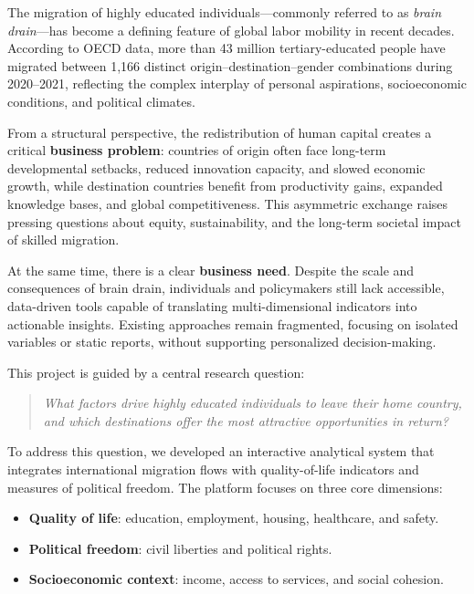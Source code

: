 \documentclass[11pt]{article}
\begin{document}
The migration of highly educated individuals—commonly referred to as \textit{brain drain}—has become a defining feature of global labor mobility in recent decades. According to OECD data, more than 43 million tertiary-educated people have migrated between 1{,}166 distinct origin–destination–gender combinations during 2020–2021, reflecting the complex interplay of personal aspirations, socioeconomic conditions, and political climates.  

\noindent
From a structural perspective, the redistribution of human capital creates a critical \textbf{business problem}: countries of origin often face long-term developmental setbacks, reduced innovation capacity, and slowed economic growth, while destination countries benefit from productivity gains, expanded knowledge bases, and global competitiveness. This asymmetric exchange raises pressing questions about equity, sustainability, and the long-term societal impact of skilled migration.  

\noindent
At the same time, there is a clear \textbf{business need}. Despite the scale and consequences of brain drain, individuals and policymakers still lack accessible, data-driven tools capable of translating multi-dimensional indicators into actionable insights. Existing approaches remain fragmented, focusing on isolated variables or static reports, without supporting personalized decision-making.  

\noindent
This project is guided by a central research question:  

\begin{quote}
    \textit{What factors drive highly educated individuals to leave their home country, and which destinations offer the most attractive opportunities in return?}
\end{quote}

\noindent
To address this question, we developed an interactive analytical system that integrates international migration flows with quality-of-life indicators and measures of political freedom. The platform focuses on three core dimensions:
\begin{itemize}
    \item \textbf{Quality of life}: education, employment, housing, healthcare, and safety.
    \item \textbf{Political freedom}: civil liberties and political rights.
    \item \textbf{Socioeconomic context}: income, access to services, and social cohesion.
\end{itemize}
\end{document}
